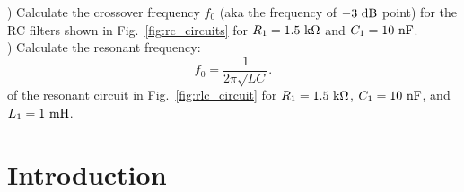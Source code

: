 ) Calculate the crossover frequency $f_0$ (aka the frequency of
$-3~\rm dB$ point) for the RC filters shown in
Fig.~\ref{fig:rc_circuits} for $R_1=1.5~\rm k\Omega$ and $C_1=10~\rm nF$.\\

) Calculate the resonant frequency:
\begin{equation}
f_0 = \frac{1}{2\pi \sqrt{LC}}. 
\end{equation}
of the resonant circuit in Fig.~\ref{fig:rlc_circuit}
for $R_1=1.5~\rm k\Omega$, $C_1=10~\rm nF$, and $L_1 = 1~\rm mH$.\\

\section{Introduction}

